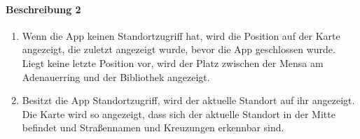 \paragraph{Beschreibung 2}
\begin{enumerate}
    \item Wenn die App keinen Standortzugriff hat, wird die Position auf der Karte angezeigt, die zuletzt angezeigt wurde, bevor die App geschlossen wurde. Liegt keine letzte Position vor, wird der Platz zwischen der Mensa am Adenauerring und der Bibliothek angezeigt.
    \item Besitzt die App Standortzugriff, wird der aktuelle Standort auf ihr angezeigt. Die Karte wird so angezeigt, dass sich der aktuelle Standort in der Mitte befindet und Straßennamen und Kreuzungen erkennbar sind.
\end{enumerate}